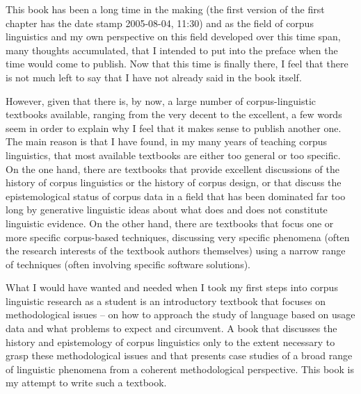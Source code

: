 \addchap{\lsPrefaceTitle}
 
This book has been a long time in the making (the first version of the first chapter has the date stamp 2005-08-04, 11:30) and as the field of corpus linguistics and my own perspective on this field developed over this time span, many thoughts accumulated, that I intended to put into the preface when the time would come to publish. Now that this time is finally there, I feel that there is not much left to say that I have not already said in the book itself.

However, given that there is, by now, a large number of corpus\hyp{}linguistic textbooks available, ranging from the very decent to the excellent, a few words seem in order to explain why I feel that it makes sense to publish another one. The main reason is that I have found, in my many years of teaching corpus linguistics, that most available textbooks are either too general or too specific. On the one hand, there are textbooks that provide excellent discussions of the history of corpus linguistics or the history of corpus design, or that discuss the epistemological status of corpus data in a field that has been dominated far too long by generative linguistic ideas about what does and does not constitute linguistic evidence. On the other hand, there are textbooks that focus one or more specific corpus\hyp{}based techniques, discussing very specific phenomena (often the research interests of the textbook authors themselves) using a narrow range of techniques (often involving specific software solutions).

What I would have wanted and needed when I took my first steps into corpus linguistic research as a student is an introductory textbook that focuses on methodological issues -- on how to approach the study of language based on usage data and what problems to expect and circumvent. A book that discusses the history and epistemology of corpus linguistics only to the extent necessary to grasp these methodological issues and that presents case studies of a broad range of linguistic phenomena from a coherent methodological perspective. This book is my attempt to write such a textbook.


